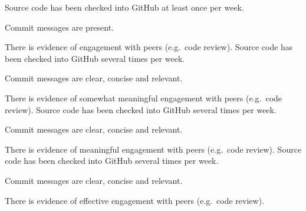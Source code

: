 \documentclass{../fal_assignment}
\begin{document}
\begin{markingrubric}
        \grade Source code  has been checked into GitHub at least once per week.
            \par Commit messages are present.
            \par There is evidence of engagement with peers (e.g.\ code review).
        \grade Source code  has been checked into GitHub several times per week.
            \par Commit messages are clear, concise and relevant.
            \par There is evidence of somewhat meaningful engagement with peers (e.g.\ code review).
        \grade Source code has been checked into GitHub several times per week.
            \par Commit messages are clear, concise and relevant.
            \par There is evidence of meaningful engagement with peers (e.g.\ code review).
        \grade Source code has been checked into GitHub several times per week.
            \par Commit messages are clear, concise and relevant.
            \par There is evidence of effective engagement with peers (e.g.\ code review).
%
	
\end{markingrubric}
\end{document}
